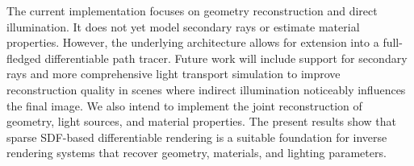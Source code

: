 \documentclass{ieeeaccess}
\begin{document}
The current implementation focuses on geometry reconstruction and direct illumination. It does not yet model secondary rays or estimate material properties. However, the underlying architecture allows for extension into a full-fledged differentiable path tracer. Future work will include support for secondary rays and more comprehensive light transport simulation to improve reconstruction quality in scenes where indirect illumination noticeably influences the final image. We also intend to implement the joint reconstruction of geometry, light sources, and material properties. The present results show that sparse SDF-based differentiable rendering is a suitable foundation for inverse rendering systems that recover geometry, materials, and lighting parameters.


\vspace{6pt}
\end{document}
